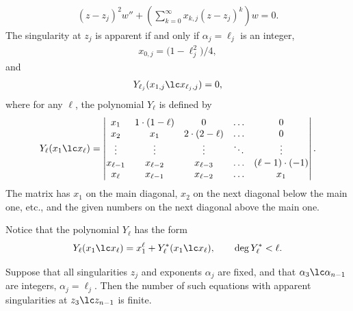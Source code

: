 \begin{gather*}
(z-z_j)^2w''+\left(\sum_{k=0}^\infty x_{k,j}(z-z_j)^k\right)w=0.
\end{gather*}
The singularity at $z_j$ is apparent if and only if
$\alpha_j=\ell_j$ is an integer,
\begin{gather*}
x_{0,j}=\big(1-\ell_j^2\big)/4,
\end{gather*}
and
\begin{gather}\label{app}
Y_{\ell_j}(x_{1,j}\lc x_{\ell_j,j})=0,
\end{gather}
where for any $\ell$, the polynomial $Y_\ell$ is defined by
\begin{gather*}
Y_{\ell}(x_1\lc x_\ell)=
\left|\begin{matrix}x_1&1\cdot(1-\ell)&0&\ldots&0\\
x_2&x_1&2\cdot(2-\ell)&\ldots&0\\
\vdots&\vdots&\vdots&\ddots&\vdots\\
x_{\ell-1}&x_{\ell-2}&x_{\ell-3}&\ldots&(\ell-1)\cdot(-1)\\
x_\ell&x_{\ell-1}&x_{\ell-2}&\ldots&x_1
\end{matrix}\right|.
\end{gather*}
The matrix has $x_1$ on the main diagonal, $x_2$ on the next diagonal below the main one, etc., and the given numbers on the next diagonal above the main one.

Notice that the polynomial $Y_{\ell}$ has the form
\begin{gather}\label{app2}
Y_\ell(x_1\lc x_\ell)=x_1^\ell+Y^*_\ell(x_1\lc x_\ell),\qquad \deg Y^*_\ell< \ell.
\end{gather}
\begin{lem}\label{lem1}
Suppose that all singularities $z_j$ and exponents $\alpha_j$ are fixed, and that $\alpha_3\lc\alpha_{n-1}$ are integers, $\alpha_j=\ell_j$. Then the number of such equations with apparent singularities at $z_3\lc z_{n-1}$ is finite.
\end{lem}

